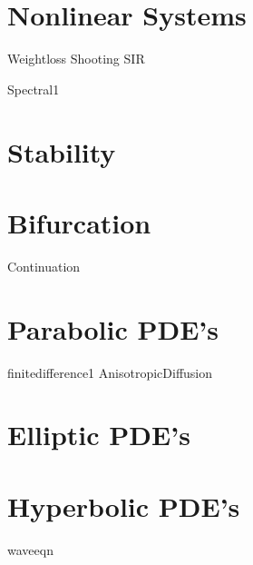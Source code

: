 \documentclass[nociteref]{SIAM-GH-book}
\begin{document}
\part{Nonlinear Systems}
{Weightloss}
{Shooting}
{SIR}



{Spectral1}

\part{Stability}

\part{Bifurcation}
{Continuation}

\part{Parabolic PDE's}
{finitedifference1}
{AnisotropicDiffusion}

\part{Elliptic PDE's}


\part{Hyperbolic PDE's}
{waveeqn}

% 
% 
% 
% 
% 
% 
\end{document}
